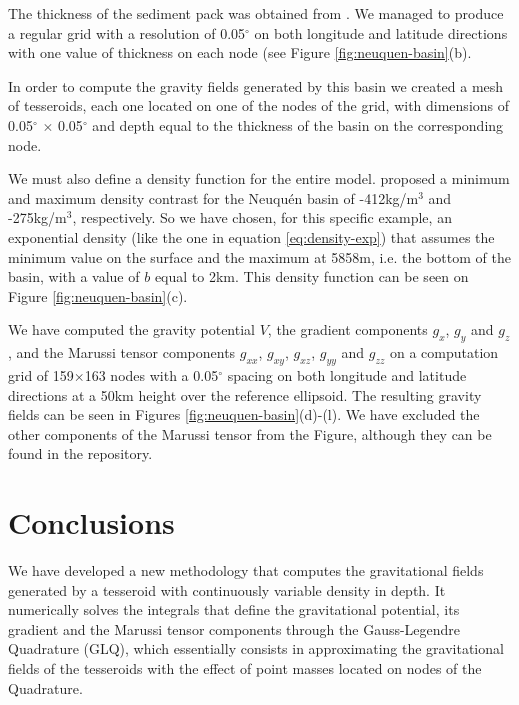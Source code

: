 \documentclass[extra]{gji}
\begin{document}
The thickness of the sediment pack was obtained from \citet{Heine2007}.
We managed to produce a regular grid with a resolution of 0.05$^\circ$ on both 
longitude and latitude directions with one value of thickness on each node 
(see Figure \ref{fig:neuquen-basin}(b).

In order to compute the gravity fields generated by this basin we created a 
mesh of tesseroids, each one located on one of the nodes of the grid, with 
dimensions of 0.05$^\circ$ $\times$ 0.05$^\circ$ and depth equal to the 
thickness of the basin on the corresponding node.

We must also define a density function for the entire model.
\citet{Sigismondi2012} proposed a minimum and maximum density contrast for the 
Neuqu\'en basin of -412kg/m$^3$ and -275kg/m$^3$, respectively.
So we have chosen, for this specific example, an exponential density (like the 
one in equation \ref{eq:density-exp}) that assumes the minimum value on the 
surface and the maximum at 5858m, i.e. the bottom of the basin, with a value 
of $b$ equal to 2km.
This density function can be seen on Figure \ref{fig:neuquen-basin}(c).

We have computed the gravity potential $V$, the gradient components $g_x$, 
$g_y$ and $g_z$, and the Marussi tensor components $g_{xx}$, $g_{xy}$, 
$g_{xz}$, $g_{yy}$  and $g_{zz}$ on a computation grid of 159$\times$163 nodes 
with a 0.05$^\circ$ spacing on both longitude and latitude directions at a 
50km height over the reference ellipsoid.
The resulting gravity fields can be seen in Figures 
\ref{fig:neuquen-basin}(d)-(l).
We have excluded the other components of the Marussi tensor from the Figure, 
although they can be found in the repository.



\section{Conclusions}

We have developed a new methodology that computes the gravitational fields 
generated by a tesseroid with continuously variable density in depth.
It numerically solves the integrals that define the gravitational potential, 
its gradient and the Marussi tensor components through the Gauss-Legendre 
Quadrature (GLQ), which essentially consists in approximating the 
gravitational fields of the tesseroids with the effect of point masses located 
on nodes of the Quadrature.
\end{document}
